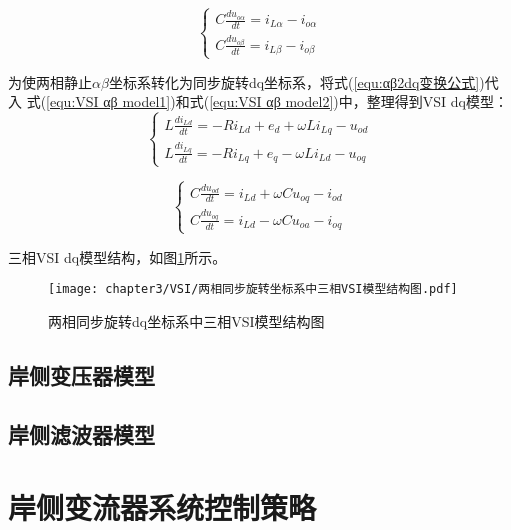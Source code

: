 \begin{equation}
	\begin{cases}
		C\frac{du_{o\alpha}}{dt}=i_{L\alpha}-i_{o\alpha} \\
		C\frac{du_{o\beta}}{dt}=i_{L\beta}-i_{o\beta}
	\end{cases}
	\label{equ:VSI αβ model2}
\end{equation}

为使两相静止$\alpha\beta$坐标系转化为同步旋转dq坐标系，将式(\ref{equ:αβ2dq变换公式})代入
式(\ref{equ:VSI αβ model1})和式(\ref{equ:VSI αβ model2})中，整理得到VSI dq模型：
\begin{equation}
	\begin{cases}
		L\frac{di_{Ld}}{dt}=-Ri_{Ld}+e_{d}+\omega Li_{Lq}-u_{od} \\
		L\frac{di_{Lq}}{dt}=-Ri_{Lq}+e_{q}-\omega Li_{Ld}-u_{oq}
	\end{cases}
	\label{equ:VSI dq model1}
\end{equation}

\begin{equation}
	\begin{cases}
		C\frac{du_{od}}{dt}=i_{Ld}+\omega Cu_{oq}-i_{od} \\
		C\frac{du_{oq}}{dt}=i_{Ld}-\omega Cu_{oa}-i_{oq}
	\end{cases}
	\label{equ:VSI dq model2}
\end{equation}

三相VSI dq模型结构，如图\ref{fig:两相同步旋转dq坐标系中三相VSI模型结构图}所示。

\begin{figure}[!htp]
	\centering
	\texttt{[image: chapter3/VSI/两相同步旋转坐标系中三相VSI模型结构图.pdf]}
	\caption{两相同步旋转dq坐标系中三相VSI模型结构图}
	\label{fig:两相同步旋转dq坐标系中三相VSI模型结构图}
\end{figure}


\subsection{岸侧变压器模型}




\subsection{岸侧滤波器模型}


\section{岸侧变流器系统控制策略}

